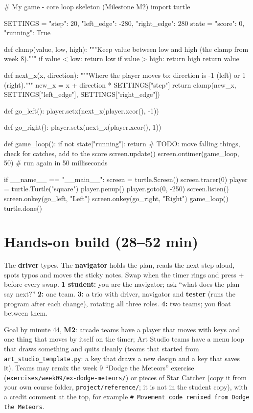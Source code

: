 \begin{pycode}
# My game - core loop skeleton (Milestone M2)
import turtle

SETTINGS = {"step": 20, "left_edge": -280, "right_edge": 280}
state = {"score": 0, "running": True}

def clamp(value, low, high):
    """Keep value between low and high (the clamp from week 8)."""
    if value < low:
        return low
    if value > high:
        return high
    return value

def next_x(x, direction):
    """Where the player moves to: direction is -1 (left) or 1 (right)."""
    new_x = x + direction * SETTINGS["step"]
    return clamp(new_x, SETTINGS["left_edge"], SETTINGS["right_edge"])

def go_left():
    player.setx(next_x(player.xcor(), -1))

def go_right():
    player.setx(next_x(player.xcor(), 1))

def game_loop():
    if not state["running"]:
        return
    # TODO: move falling things, check for catches, add to the score
    screen.update()
    screen.ontimer(game_loop, 50)   # run again in 50 milliseconds

if __name__ == "__main__":
    screen = turtle.Screen()
    screen.tracer(0)
    player = turtle.Turtle("square")
    player.penup()
    player.goto(0, -250)
    screen.listen()
    screen.onkey(go_left, "Left")
    screen.onkey(go_right, "Right")
    game_loop()
    turtle.done()
\end{pycode}

\section{Hands-on build (28--52 min)}
\begin{pairroles}
The \textbf{driver} types. The \textbf{navigator} holds the plan, reads the next step aloud, spots
typos and moves the sticky notes. Swap when the timer rings and press + before
every swap. \textbf{1 student:} you are the navigator; ask \enquote{what does the plan say next?}
\textbf{2:} one team. \textbf{3:} a trio with driver, navigator and \textbf{tester} (runs the program
after each change), rotating all three roles. \textbf{4:} two teams; you float between them.
\end{pairroles}

Goal by minute 44, \textbf{M2}: arcade teams have a player that moves with keys and one thing that
moves by itself on the timer; Art Studio teams have a menu loop that draws something and quits
cleanly (teams that started from \texttt{art\_studio\_template.py}: a key that draws a new design and a key that saves it). Teams may remix the week 9 \enquote{Dodge the Meteors} exercise
(\texttt{exercises/week09/ex-dodge-meteors/}) or pieces of Star Catcher (copy it from your own course folder,
\texttt{project/reference/}; it is not in the student copy), with a credit comment at
the top, for example \texttt{\# Movement code remixed from Dodge the Meteors}.

